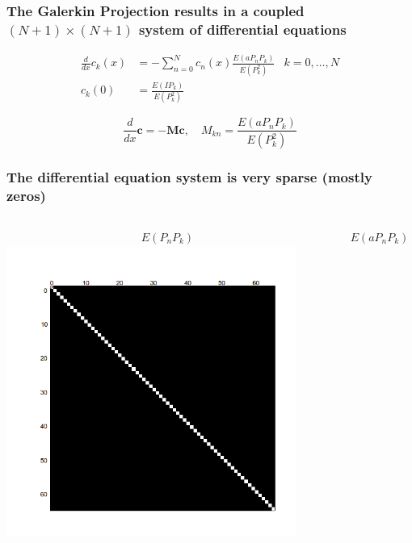 \documentclass[handout]{beamer}
\begin{document}
\begin{frame}
 \frametitle{The Galerkin Projection results in a coupled $(N+1)\times (N+1)$ system of differential equations}
 \begin{align*}
     \frac{d}{dx}c_k(x) &= -\sum_{n=0}^N c_n(x) \frac{E(aP_nP_k)}{E(P_k^2)}
     & k=0,\dots,N\\
 c_k(0) &= \frac{E(IP_k)}{E(P_k^2)}
 \end{align*}

\[ \frac{d}{dx}\bm{c} = -\bm{M}\bm{c},\quad M_{kn}= \frac{E(aP_nP_k)}{E(P_k^2)}\]
 \end{frame}


\begin{frame}
 \frametitle{The differential equation system is very sparse (mostly zeros)}
 \begin{columns}
\begin{center}
    \begin{align*}
        E(P_nP_k)
    \end{align*}
  \includegraphics[width=0.9\textwidth]{binary_matrix1.png}
\end{center}
     \begin{center}
    \begin{align*}
        E(aP_nP_k)
    \end{align*}

\end{center}
\end{columns}
\end{frame}
\end{document}
